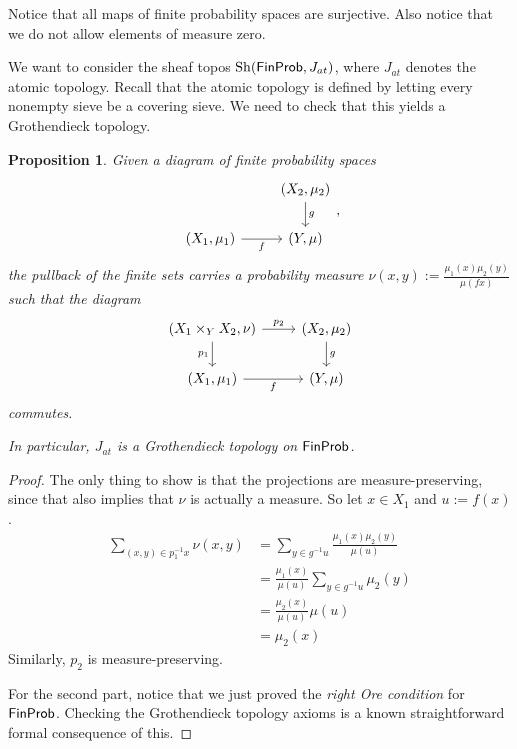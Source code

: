 \documentclass[a4paper]{amsproc}
\theoremstyle{plain}
\newtheorem{proposition}[theorem]{Proposition}
\theoremstyle{definition}
\theoremstyle{remark}
\numberwithin{equation}{section}
\DeclareMathOperator{\Sh}{Sh}
\newcommand{\FinProb}{\textup{\textsf{FinProb}}}
\begin{document}
Notice that all maps of finite probability spaces are surjective. Also notice that we do not allow elements of measure zero.

We want to consider the sheaf topos $\Sh(\FinProb, J_{at})$, where $J_{at}$ denotes the atomic topology. Recall that the atomic topology is defined by letting every nonempty sieve be a covering sieve. We need to check that this yields a Grothendieck topology.

\begin{proposition} \label{pullback_measure}
    Given a diagram of finite probability spaces
    \[
    \begin{tikzcd}
                                & {(X_2,\mu_2)} \arrow[d, "g"] \\
    {(X_1, \mu_1)} \arrow[r, "f"'] & {(Y,\mu)}
    \end{tikzcd},
    \]
    the pullback of the finite sets carries a probability measure $\nu(x,y) := \frac{\mu_1(x) \mu_2(y)}{\mu(f x)}$ such that the diagram
    \[
    \begin{tikzcd}
    {(X_1 \times_Y X_2, \nu)} \arrow[d, "p_1"'] \arrow[r, "p_2"] & {(X_2,\mu_2)} \arrow[d, "g"] \\
    {(X_1, \mu_1)} \arrow[r, "f"']                               & {(Y,\mu)}
    \end{tikzcd}
    \]
    commutes.

    In particular, $J_{at}$ is a Grothendieck topology on $\FinProb$.
\end{proposition}
\begin{proof}
    The only thing to show is that the projections are measure-preserving, since that also implies that $\nu$ is actually a measure. So let $x \in X_1$ and $u := f(x)$.
    \begin{align*}
        \sum_{(x,y) \in p_1^{-1} x} \nu(x,y) &= \sum_{y \in g^{-1} u} \frac{\mu_1(x)\mu_2(y)}{\mu(u)} \\
        &= \frac{\mu_1(x)}{\mu(u)} \sum_{y \in g^{-1} u} \mu_2(y) \\
        &= \frac{\mu_2(x)}{\mu(u)} \mu(u) \\
        &= \mu_2(x)
    \end{align*}
    Similarly, $p_2$ is measure-preserving.

    For the second part, notice that we just proved the \emph{right Ore condition} for $\FinProb$. Checking the Grothendieck topology axioms is a known straightforward formal consequence of this.
\end{proof}
\end{document}
